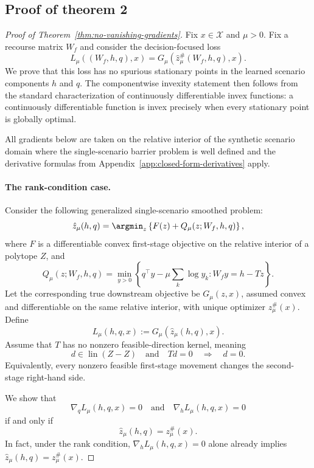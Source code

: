 \subsection{Proof of theorem 2}
\label{app:no-vanishing-gradients-proof}

\begin{proof}[Proof of Theorem~\ref{thm:no-vanishing-gradients}]
Fix $x\in\mathcal X$ and $\mu>0$. Fix a recourse matrix $W_f$ and consider the decision-focused loss
\[
L_\mu((W_f,h,q),x)
=
G_\mu(\hat z_\mu^\#(W_f,h,q),x).
\]
We prove that this loss has no spurious stationary points in the learned scenario components $h$ and $q$. The componentwise invexity statement then follows from the standard characterization of continuously differentiable invex functions: a continuously differentiable function is invex precisely when every stationary point is globally optimal.

All gradients below are taken on the relative interior of the synthetic scenario domain where the single-scenario barrier problem is well defined and the derivative formulas from Appendix~\ref{app:closed-form-derivatives} apply.

\paragraph{The rank-condition case.}
Consider the following generalized single-scenario smoothed problem:
\[
\hat z_\mu(h,q)
=
\argmin_z
\left\{
F(z)+Q_\mu(z;W_f,h,q)
\right\},
\]
where $F$ is a differentiable convex first-stage objective on the relative interior of a polytope $Z$, and
\[
Q_\mu(z;W_f,h,q)
=
\min_{y>0}
\left\{
q^\top y-\mu\sum_k\log y_k:
W_fy=h-Tz
\right\}.
\]
Let the corresponding true downstream objective be $G_\mu(z,x)$, assumed convex and differentiable on the same relative interior, with unique optimizer $z_\mu^\#(x)$. Define
\[
L_\mu(h,q,x):=G_\mu(\hat z_\mu(h,q),x).
\]
Assume that $T$ has no nonzero feasible-direction kernel, meaning
\[
d\in\operatorname{lin}(Z-Z)
\quad\text{and}\quad
Td=0
\quad\Longrightarrow\quad
d=0.
\]
Equivalently, every nonzero feasible first-stage movement changes the second-stage right-hand side.

We show that
\[
\nabla_q L_\mu(h,q,x)=0
\quad\text{and}\quad
\nabla_h L_\mu(h,q,x)=0
\]
if and only if
\[
\hat z_\mu(h,q)=z_\mu^\#(x).
\]
In fact, under the rank condition, $\nabla_hL_\mu(h,q,x)=0$ alone already implies $\hat z_\mu(h,q)=z_\mu^\#(x)$.


\end{proof}

